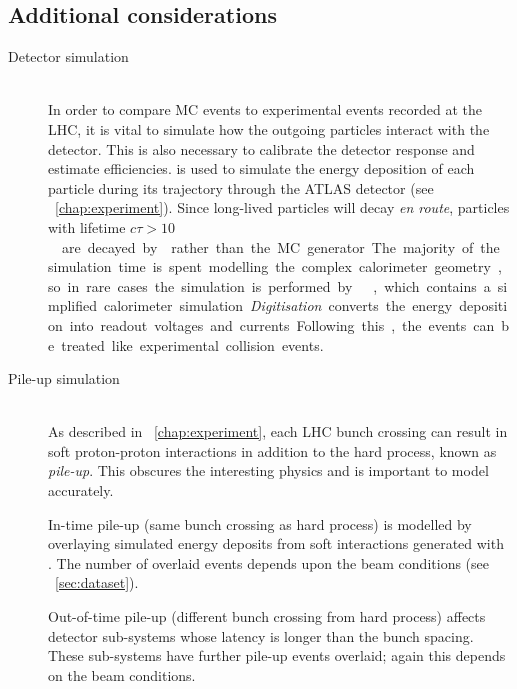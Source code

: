 \subsection{Additional considerations}
\label{sec:mc:other}

\begin{description}
\item[Detector simulation] \hfill \\
	In order to compare \ac{MC} events to experimental events recorded at the \acs{LHC}, 
	it is vital to simulate how the outgoing particles interact with the detector. This 
	is also necessary to calibrate the detector response and estimate efficiencies. 
	\geant \cite{GEANT4,ATLAS-simulation} is used to simulate the energy deposition of 
	each particle during its trajectory through the ATLAS detector (see 
	\Chapter~\ref{chap:experiment}). Since long-lived particles will decay \textit{en 
	route}, particles with lifetime \unit{$c\tau > 10$}{\milli\metre} are decayed by 
	\geant rather than the \ac{MC} generator. The majority of the simulation time is 
	spent modelling the complex calorimeter geometry, so in rare cases the simulation is 
	performed by \atlfast \cite{Atlfast}, which contains a simplified calorimeter 
	simulation.

	\textit{Digitisation} converts the energy deposition into readout voltages and 
	currents. Following this, the events can be treated like experimental collision 
	events.
\item[Pile-up simulation] \hfill \\
	As described in \Chapter~\ref{chap:experiment}, each \acs{LHC} bunch crossing can 
	result in soft proton-proton interactions in addition to the hard process, known as 
	\textit{pile-up}. This obscures the interesting physics and is important to model 
	accurately.

	In-time pile-up (same bunch crossing as hard process) is modelled by overlaying 
	simulated energy deposits from soft \pp interactions generated with . The 
	number of overlaid events depends upon the beam conditions (see 
	\Section~\ref{sec:dataset}).

	Out-of-time pile-up (different bunch crossing from hard process) affects detector 
	sub-systems whose latency is longer than the bunch spacing. These sub-systems have 
	further pile-up events overlaid; again this depends on the beam conditions.
\end{description}

